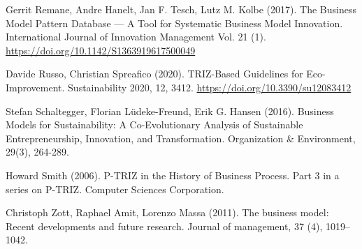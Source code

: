 \documentclass[11pt,a4paper]{article}
\begin{document}
\begin{thebibliography}{xxx}
 Gerrit Remane, Andre Hanelt, Jan F. Tesch, Lutz M. Kolbe
  (2017).  The Business Model Pattern Database — A Tool for Systematic
  Business Model Innovation.  International Journal of Innovation Management
  Vol. 21 (1).\\ \url{https://doi.org/10.1142/S1363919617500049}
  
 Davide Russo, Christian Spreafico (2020).  TRIZ-Based
  Guidelines for Eco-Improvement. Sustainability 2020, 12, 3412.
  \url{https://doi.org/10.3390/su12083412}

 Stefan Schaltegger, Florian Lüdeke-Freund, Erik
  G. Hansen (2016). Business Models for Sustainability: A Co-Evolutionary
  Analysis of Sustainable Entrepreneurship, Innovation, and Transformation.
  Organization \& Environment, 29(3), 264-289.

 Howard Smith (2006). P-TRIZ in the History of Business
  Process. Part 3 in a series on P-TRIZ.  Computer Sciences Corporation.

 Christoph Zott, Raphael Amit, Lorenzo Massa (2011). The
  business model: Recent developments and future research. Journal of
  management, 37 (4), 1019–1042.
  
\end{thebibliography}
\end{document}
